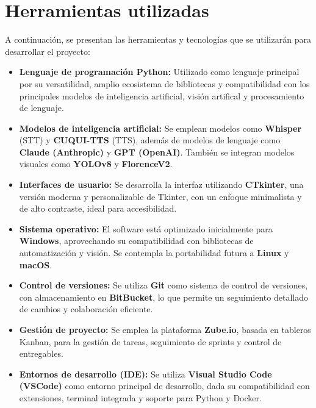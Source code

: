 \section{Herramientas utilizadas}

A continuación, se presentan las herramientas y tecnologías que se utilizarán para desarrollar el proyecto:

\begin{itemize}
    \item \textbf{Lenguaje de programación Python:} Utilizado como lenguaje principal por su versatilidad, amplio ecosistema de bibliotecas y compatibilidad con los principales modelos de inteligencia artificial, visión artifical y procesamiento de lenguaje.

    \item \textbf{Modelos de inteligencia artificial:} Se emplean modelos como \textbf{Whisper} (STT) y \textbf{CUQUI-TTS} (TTS), además de modelos de lenguaje como \textbf{Claude (Anthropic)} y \textbf{GPT (OpenAI)}. También se integran modelos visuales como \textbf{YOLOv8} y \textbf{FlorenceV2}.

    \item \textbf{Interfaces de usuario:} Se desarrolla la interfaz utilizando \textbf{CTkinter}, una versión moderna y personalizable de Tkinter, con un enfoque minimalista y de alto contraste, ideal para accesibilidad.

    \item \textbf{Sistema operativo:} El software está optimizado inicialmente para \textbf{Windows}, aprovechando su compatibilidad con bibliotecas de automatización y visión. Se contempla la portabilidad futura a \textbf{Linux} y \textbf{macOS}.

    \item \textbf{Control de versiones:} Se utiliza \textbf{Git} como sistema de control de versiones, con almacenamiento en \textbf{BitBucket}, lo que permite un seguimiento detallado de cambios y colaboración eficiente.

    \item \textbf{Gestión de proyecto:} Se emplea la plataforma \textbf{Zube.io}, basada en tableros Kanban, para la gestión de tareas, seguimiento de sprints y control de entregables.

    \item \textbf{Entornos de desarrollo (IDE):} Se utiliza \textbf{Visual Studio Code (VSCode)} como entorno principal de desarrollo, dada su compatibilidad con extensiones, terminal integrada y soporte para Python y Docker.


\end{itemize}
